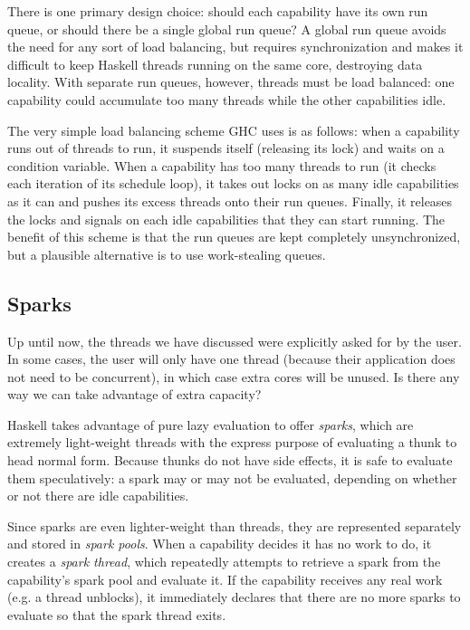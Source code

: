 There is one primary design choice: should each capability have its own
run queue, or should there be a single global run queue?  A global run
queue avoids the need for any sort of load balancing, but requires
synchronization and makes it difficult to keep Haskell threads running on
the same core, destroying data locality.  With separate run queues, however,
threads must be load balanced: one capability could accumulate too many
threads while the other capabilities idle.

The very simple load balancing scheme GHC uses is as follows: when a
capability runs out of threads to run, it suspends itself (releasing its
lock) and waits on a condition variable.  When a capability has too many
threads to run (it checks each iteration of its schedule loop), it takes
out locks on as many idle capabilities as it can and pushes its excess
threads onto their run queues.  Finally, it releases the locks and
signals on each idle capabilities that they can start running.  The
benefit of this scheme is that the run queues are kept completely
unsynchronized, but a plausible alternative is to use work-stealing
queues.

\subsection{Sparks}

Up until now, the threads we have discussed were explicitly asked for
by the user.  In some cases, the user will only have one thread (because
their application does not need to be concurrent), in which case extra
cores will be unused.  Is there any way we can take advantage of extra
capacity?

Haskell takes advantage of pure lazy evaluation to offer \emph{sparks},
which are extremely light-weight threads with the express purpose of
evaluating a thunk to head normal form.  Because thunks do not have
side effects, it is safe to evaluate them speculatively: a spark may
or may not be evaluated, depending on whether or not there are idle capabilities.

Since sparks are even lighter-weight than threads, they are represented
separately and stored in \emph{spark pools}.  When a capability decides
it has no work to do, it creates a \emph{spark thread}, which repeatedly
attempts to retrieve a spark from the capability's spark pool and
evaluate it.  If the capability receives any real work (e.g. a thread
unblocks), it immediately declares that there are no more sparks to
evaluate so that the spark thread exits.

